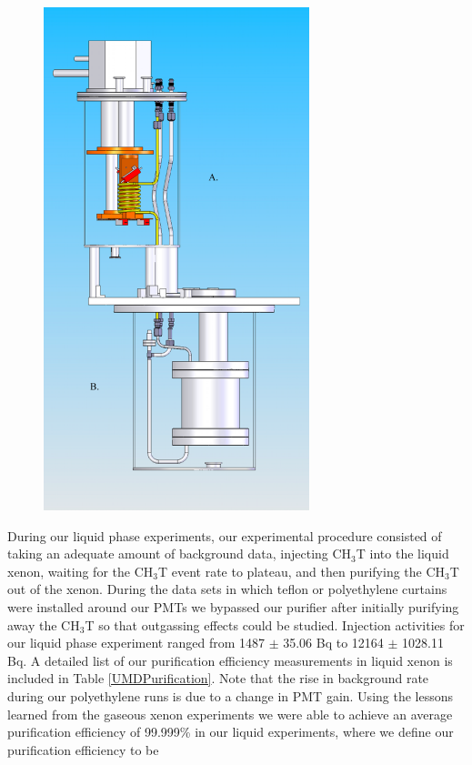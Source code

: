 \documentclass[a4paper,12pt]{article}
\begin{document}
{\begin{figure}
\includegraphics[scale=.45]{UMDCryo.png} 
\label{UMDcryo}
\end{figure}


During our liquid phase experiments, our experimental procedure consisted of
taking an adequate amount of background data, injecting CH$_3$T into the liquid xenon, waiting for the CH$_3$T event rate to plateau, and then purifying the CH$_3$T
out of the xenon. During the data sets in which teflon or polyethylene curtains
were installed around our PMTs we bypassed our purifier after initially purifying
away the CH$_3$T so that outgassing effects could be studied. Injection activities for our liquid phase experiment ranged from 1487 $\pm$ 35.06 Bq to 12164 $\pm$ 1028.11 Bq.
A detailed list of our purification efficiency measurements in liquid xenon is
included in Table \ref{UMDPurification}. Note that the rise in background rate during our polyethylene runs is due to a change in PMT gain. Using the lessons learned from the gaseous xenon experiments we were able to achieve an average purification efficiency of 99.999\% in our liquid experiments, where we define our purification efficiency to be 

}
\end{document}
